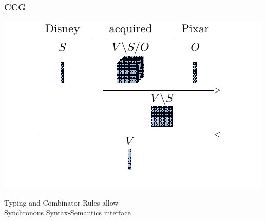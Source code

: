 \documentclass[mathserif,12pt]{beamer}
\begin{document}
\begin{frame}
\end{frame}

\begin{frame}
\frametitle{CCG}
\centering
\includegraphics[trim=3em 1em 3em 0em,clip=true,scale=1.3]{figures/ccg-transitive-svo-derivation-tensors} 

\pause
\large
Typing and Combinator Rules allow \\Synchronous Syntax-Semantics interface
\end{frame}
\end{document}
